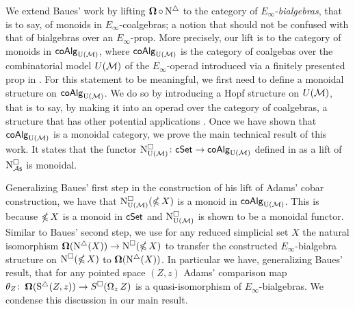 We extend Baues' work by lifting $\operatorname{\mathbf{\Omega}} \circ \operatorname{N^{\triangle}}$ to the category of $E_{\infty}$-\textit{bialgebras}, that is to say, of monoids in $E_{\infty}$-coalgebras; a notion that should not be confused with that of bialgebras over an $E_{\infty}$-prop.
More precisely, our lift is to the category of monoids in $\mathsf{coAlg}_{\operatorname{U}(\mathcal{M})}$, where $\mathsf{coAlg}_{\operatorname{U}(\mathcal{M})}$ is the category of coalgebas over the combinatorial model $U(\mathcal{M})$ of the $E_{\infty}$-operad introduced via a finitely presented prop in \cite{medina2020prop1}.
For this statement to be meaningful, we first need to define a monoidal structure on $\mathsf{coAlg}_{\operatorname{U}(\mathcal{M})}$.
We do so by introducing a Hopf structure on $U(\mathcal{M})$, that is to say, by making it into an operad over the category of coalgebras, a structure that has other potential applications \cite{livernet2008hopf}.
Once we have shown that $\mathsf{coAlg}_{\operatorname{U}(\mathcal{M})}$ is a monoidal category, we prove the main technical result of this work.
It states that the functor $\operatorname{N^{\square}_{{\operatorname{U}(\mathcal{M})}}} \colon \mathsf{cSet} \to \mathsf{coAlg}_{\operatorname{U}(\mathcal{M})}$ defined in \cite{medina2021cubical} as a lift of $\operatorname{N^{\square}_{{\mathcal{A}\mathsf{s}}}}$ is monoidal.

Generalizing Baues' first step in the construction of his lift of Adams' cobar construction, we have that $\operatorname{N^{\square}_{{\operatorname{U}(\mathcal{M})}}}(\operatorname{\mathbb{\Omega}} X)$ is a monoid in $\mathsf{coAlg}_{\operatorname{U}(\mathcal{M})}$.
This is because $\operatorname{\mathbb{\Omega}} X$ is a monoid in $\mathsf{cSet}$ and $\operatorname{N^{\square}_{{\operatorname{U}(\mathcal{M})}}}$ is shown to be a monoidal functor.
Similar to Baues' second step, we use for any reduced simplicial set $X$ the natural isomorphism $\operatorname{\mathbf{\Omega}}(\operatorname{N^{\triangle}}(X)) \to \operatorname{N^{\square}}(\operatorname{\mathbb{\Omega}} X)$ to transfer the constructed $E_{\infty}$-bialgebra structure on $\operatorname{N^{\square}}(\operatorname{\mathbb{\Omega}} X)$ to $\operatorname{\mathbf{\Omega}}(\operatorname{N^{\triangle}}(X))$.
In particular we have, generalizing Baues' result, that for any pointed space $(Z, z)$ Adams' comparison map $\theta_Z \colon \operatorname{\mathbf{\Omega}}(\operatorname{S^{\triangle}}(Z, z)) \to S^{\square}(\operatorname{\Omega}_z Z)$ is a quasi-isomorphism of $E_{\infty}$-bialgebras.
We condense this discussion in our main result.

